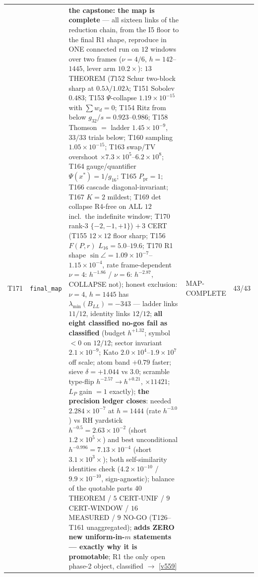 \documentclass[11pt,a4paper]{article}
\begin{document}
{\begin{xltabular}{\linewidth}{@{}p{0.95cm} >{\raggedright\arraybackslash}p{3.1cm} Y >{\raggedright\scriptsize\arraybackslash}p{3.35cm} p{1.15cm}@{}}
T171 & \texttt{\scriptsize final\_\allowbreak map} & \textbf{the capstone: the map is complete} --- all sixteen links of the reduction chain, from the I5 floor to the final R1 shape, reproduce in ONE connected run on $12$ windows over two frames ($\nu=4/6$, $h=142$--$1445$, lever arm $10.2\times$): $13$ THEOREM ($T152$ Schur two-block sharp at $0.5\lambda/1.02\lambda$; T151 Sobolev $0.483$; T153 $\Psi$-collapse $1.19\times10^{-15}$ with $\sum w_d=0$; T154 Ritz from below $g_{32}/s=0.923$--$0.986$; T158 Thomson $=$ ladder $1.45\times10^{-9}$, $33/33$ trials below; T160 sampling $1.05\times10^{-15}$; T163 swap/TV overshoot $\times7.3\times10^{5}$--$6.2\times10^{8}$; T164 gauge/quantifier $\Psi(x^*)=1/g_{16}$; T165 $P_{\mathrm{pr}}=1$; T166 cascade diagonal-invariant; T167 $K=2$ mildest; T169 det collapse R4-free on ALL $12$ incl.\ the indefinite window; T170 rank-3 $\{-2,-1,+1\}$) $+\,3$ CERT (T155 $12\times12$ floor sharp; T156 $F(P,r)$ $L_{16}=5.0$--$19.6$; T170 R1 shape $\sin\angle=1.09\times10^{-7}$--$1.15\times10^{-4}$, rate frame-dependent $\nu=4$: $h^{-1.86}$ / $\nu=6$: $h^{-2.87}$, COLLAPSE not); honest exclusion: $\nu=4$, $h=1445$ has $\lambda_{\min}(B_{LL})=-343$ --- ladder links $11/12$, identity links $12/12$; \textbf{all eight classified no-gos fail as classified} (budget $h^{+1.32}$; symbol $<0$ on $12/12$; sector invariant $2.1\times10^{-9}$; Kato $2.0\times10^{4}$--$1.9\times10^{7}$ off scale; atom band $+0.79$ faster; sieve $\delta=+1.044$ vs $3.0$; scramble type-flip $h^{-2.57}\to h^{+0.21}$, $\times11421$; $L_P$ gain $=1$ exactly); \textbf{the precision ledger closes}: needed $2.284\times10^{-7}$ at $h=1444$ (rate $h^{-3.0}$) vs RH yardstick $h^{-0.5}=2.63\times10^{-2}$ (short $1.2\times10^{5}\times$) and best unconditional $h^{-0.996}=7.13\times10^{-4}$ (short $3.1\times10^{3}\times$); both self-similarity identities check ($4.2\times10^{-10}$ / $9.9\times10^{-10}$, sign-agnostic); balance of the quotable parts $40$ THEOREM / $5$ CERT-UNIF / $9$ CERT-WINDOW / $16$ MEASURED / $9$ NO-GO (T126--T161 unaggregated); \textbf{adds ZERO new uniform-in-$m$ statements --- exactly why it is promotable}; R1 the only open phase-2 object, classified $\to$ \vref{v559} & MAP-COMPLETE & 43/43\\

\end{xltabular}}
\end{document}
